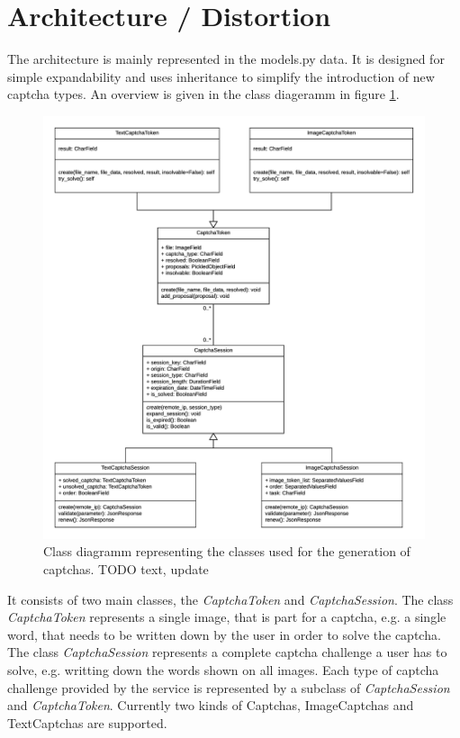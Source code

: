 \section{Architecture / Distortion}
\label{sec:architecture}

The architecture is mainly represented in the models.py data. It is designed for simple expandability and uses inheritance to simplify the introduction of new captcha types.  An overview is given in the class diageramm in figure \ref{fig:classdia}. 

\begin{figure}[!h]
\centering
\includegraphics[width=1.5\linewidth]{content/figures/classdiagramm.png}
\caption{Class diagramm representing the classes used for the generation of captchas. TODO text, update
}
\label{fig:classdia}
\end{figure}

It consists of two main classes, the \emph{CaptchaToken} and \emph{CaptchaSession}. The class \emph{CaptchaToken} represents a single image, that is part for a captcha, e.g. a single word, that needs to be written down by the user in order to solve the captcha. The class \emph{CaptchaSession} represents a complete captcha challenge a user has to solve, e.g. writting down the words shown on all images. Each type of captcha challenge provided by the service is represented by a subclass of \emph{CaptchaSession} and \emph{CaptchaToken}. Currently two kinds of Captchas, ImageCaptchas and TextCaptchas are supported.


